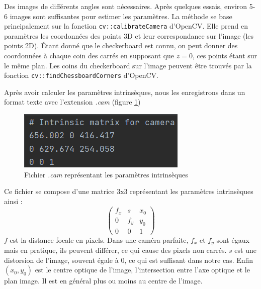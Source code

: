             Des images de différents angles sont nécessaires. Après quelques essais, environ 5-6 images sont suffisantes pour estimer les paramètres. La méthode se base principalement sur la fonction \verb|cv::calibrateCamera| d'OpenCV. Elle prend en paramètres les coordonnées des points 3D et leur correspondance sur l'image (les points 2D). Étant donné que le checkerboard est connu, on peut donner des coordonnées à chaque coin des carrés en supposant que $z=0$, ces points étant sur le même plan. Les coins du checkerboard sur l'image peuvent être trouvés par la fonction \verb|cv::findChessboardCorners| d'OpenCV.

            Après avoir calculer les paramètres intrinsèques, nous les enregistrons dans un format texte avec l'extension \emph{.cam} (figure \ref{fig:cam})

            \begin{figure}[!h]
                \centering
                \includegraphics[scale=0.8]{img/rendu/cam.png}
                \caption{Fichier \emph{.cam} représentant les paramètres intrinsèques}
                \label{fig:cam}
            \end{figure}

            Ce fichier se compose d'une matrice 3x3 représentant les paramètres intrinsèques ainsi :
            \begin{equation*}
                \begin{pmatrix}
                    f_x & s & x_0 \\
                    0 & f_y & y_0 \\
                    0 & 0 & 1
                \end{pmatrix}
            \end{equation*}
            $f$ est la distance focale en pixels. Dans une caméra parfaite, $f_x$ et $f_y$ sont égaux mais en pratique, ils peuvent différer, ce qui cause des pixels non carrés. $s$ est une distorsion de l'image, souvent égale à 0, ce qui est suffisant dans notre cas. Enfin $(x_0, y_0)$ est le centre optique de l'image, l'intersection entre l'axe optique et le plan image. Il est en général plus ou moins au centre de l'image. 

